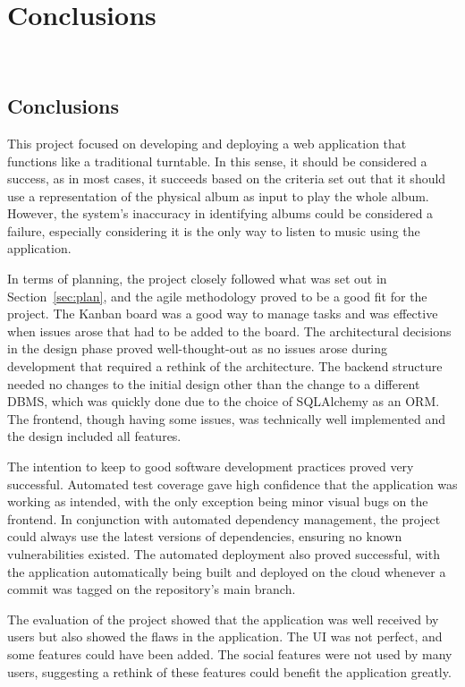 \chapter{Conclusions}~\label{cha:conclusion}

\section{Conclusions}
This project focused on developing and deploying a web application that functions like a traditional turntable. In this sense, it should be considered a success, as in most cases, it succeeds based on the criteria set out that it should use a representation of the physical album as input to play the whole album. However, the system's inaccuracy in identifying albums could be considered a failure, especially considering it is the only way to listen to music using the application.

In terms of planning, the project closely followed what was set out in Section~\ref{sec:plan}, and the agile methodology proved to be a good fit for the project. The Kanban board was a good way to manage tasks and was effective when issues arose that had to be added to the board. The architectural decisions in the design phase proved well-thought-out as no issues arose during development that required a rethink of the architecture. The backend structure needed no changes to the initial design other than the change to a different DBMS, which was quickly done due to the choice of SQLAlchemy as an ORM. The frontend, though having some issues, was technically well implemented and the design included all features.

The intention to keep to good software development practices proved very successful. Automated test coverage gave high confidence that the application was working as intended, with the only exception being minor visual bugs on the frontend. In conjunction with automated dependency management, the project could always use the latest versions of dependencies, ensuring no known vulnerabilities existed. The automated deployment also proved successful, with the application automatically being built and deployed on the cloud whenever a commit was tagged on the repository's main branch.

The evaluation of the project showed that the application was well received by users but also showed the flaws in the application. The UI was not perfect, and some features could have been added. The social features were not used by many users, suggesting a rethink of these features could benefit the application greatly.

